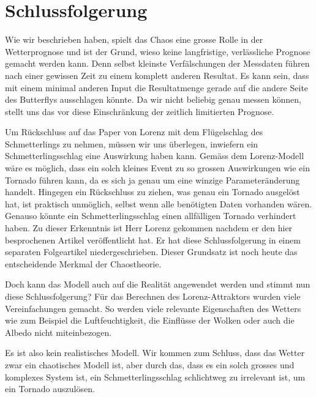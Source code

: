 \section{Schlussfolgerung}\label{outro}
Wie wir beschrieben haben, spielt das Chaos eine grosse Rolle in der Wetterprognose und ist der Grund, wieso keine langfristige, verlässliche Prognose gemacht werden kann. Denn selbst kleinste Verfälschungen der Messdaten führen nach einer gewissen Zeit zu einem komplett anderen Resultat. Es kann sein, dass mit einem minimal anderen Input die Resultatmenge gerade auf die andere Seite des Butterflys ausschlagen könnte. Da wir nicht beliebig genau messen können, stellt uns das vor diese Einschränkung der zeitlich limitierten Prognose.

Um Rückschluss auf das Paper von Lorenz mit dem Flügelschlag des Schmetterlings zu nehmen, müssen wir uns überlegen, inwiefern ein Schmetterlingsschlag eine Auswirkung haben kann. Gemäss dem Lorenz-Modell wäre es möglich, dass ein solch kleines Event zu so grossen Auswirkungen wie ein Tornado führen kann, da es sich ja genau um eine winzige Parameteränderung handelt. Hingegen ein Rückschluss zu ziehen, was genau ein Tornado ausgelöst hat, ist praktisch unmöglich, selbst wenn alle benötigten Daten vorhanden wären. Genauso könnte ein Schmetterlingsschlag einen allfälligen Tornado verhindert haben. Zu dieser Erkenntnis ist Herr Lorenz gekommen nachdem er den hier besprochenen Artikel veröffentlicht hat. Er hat diese Schlussfolgerung in einem separaten Folgeartikel\cite{Lorenz63} niedergeschrieben. Dieser Grundsatz ist noch heute das entscheidende Merkmal der Chaostheorie.

Doch kann das Modell auch auf die Realität angewendet werden und stimmt nun diese Schlussfolgerung? Für das Berechnen des Lorenz-Attraktors wurden viele Vereinfachungen gemacht. So werden viele relevante Eigenschaften des Wetters wie zum Beispiel die Luftfeuchtigkeit, die Einflüsse der Wolken oder auch die Albedo nicht miteinbezogen. 

Es ist also kein realistisches Modell. Wir kommen zum Schluss, dass das Wetter zwar ein chaotisches Modell ist, aber durch das, dass es ein solch grosses und komplexes System ist, ein Schmetterlingsschlag schlichtweg zu irrelevant ist, um ein Tornado auszulösen. 
